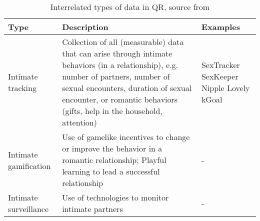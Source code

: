 \begin{table*}
	\caption{Interrelated types of data in \acl{QR}, source from \cite{doi:10.1080/15265161.2017.1409823}}
	\label{tab:typ_of_QR}
	\scriptsize
	\begin{center}
		\begin{tabular}{|p{4cm}|p{11cm}|p{2cm}|}
			\hline
			Type & Description & Examples \\
			\hline
			\hline
			Intimate tracking &  Collection of all (measurable) data that can arise through intimate behaviors (in a relationship), e.g. number of partners, number of sexual encounters, duration of sexual encounter, or romantic behaviors (gifts, help in the household, attention) & SexTracker \newline SexKeeper \newline Nipple \newline Lovely \newline kGoal \\
			\hline
			Intimate gamification & Use of gamelike incentives to change or improve the behavior in a romantic relationship; Playful learning to lead a successful relationship & - \\
			\hline
			Intimate surveillance & Use of technologies to monitor intimate partners & - \\
			\hline
		\end{tabular}
	\end{center}
\end{table*}